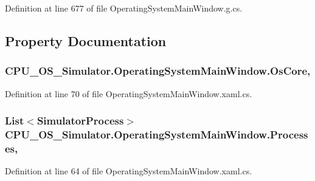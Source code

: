 Definition at line 677 of file Operating\+System\+Main\+Window.\+g.\+cs.



\subsection{Property Documentation}
\hypertarget{class_c_p_u___o_s___simulator_1_1_operating_system_main_window_ad714e0ed6e880516f8afc3f1531a2d14}{}
\subsubsection[{Os\+Core}]{ C\+P\+U\+\_\+\+O\+S\+\_\+\+Simulator.\+Operating\+System\+Main\+Window.\+Os\+Core\hspace{0.3cm}{\ttfamily [get]}, {\ttfamily [set]}}\label{class_c_p_u___o_s___simulator_1_1_operating_system_main_window_ad714e0ed6e880516f8afc3f1531a2d14}


Definition at line 70 of file Operating\+System\+Main\+Window.\+xaml.\+cs.

\hypertarget{class_c_p_u___o_s___simulator_1_1_operating_system_main_window_aadbbb1f580d767211e180a95ec71b849}{}
\subsubsection[{Processes}]{\setlength{\rightskip}{0pt plus 5cm}List$<${\bf Simulator\+Process}$>$ C\+P\+U\+\_\+\+O\+S\+\_\+\+Simulator.\+Operating\+System\+Main\+Window.\+Processes\hspace{0.3cm}{\ttfamily [get]}, {\ttfamily [set]}}\label{class_c_p_u___o_s___simulator_1_1_operating_system_main_window_aadbbb1f580d767211e180a95ec71b849}


Definition at line 64 of file Operating\+System\+Main\+Window.\+xaml.\+cs.



